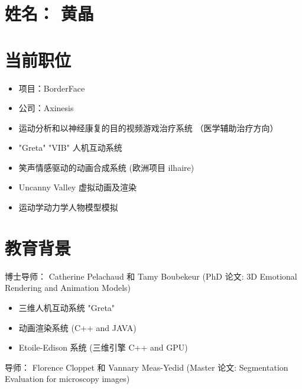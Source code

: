 \section{姓名： 黄晶}
\section{当前职位}
{
\begin{itemize}
\item 项目：BorderFace
\item 公司：Axinesis
\item 运动分析和以神经康复的目的视频游戏治疗系统 （医学辅助治疗方向）
\end{itemize}
}

{
\begin{itemize}
	\item "Greta" "VIB" 人机互动系统
	\item 笑声情感驱动的动画合成系统 (欧洲项目 ilhaire)
	\item Uncanny Valley 虚拟动画及渲染
	\item 运动学动力学人物模型模拟
\end{itemize}
}


\section{教育背景}
{博士导师： Catherine Pelachaud 和 Tamy Boubekeur (PhD 论文: 3D Emotional Rendering and Animation Models)
\begin{itemize}
	\item 三维人机互动系统 "Greta"
	\item 动画渲染系统 (C++ and JAVA)
	\item Etoile-Edison 系统 (三维引擎 C++ and GPU)
\end{itemize}
}  %

{导师： Florence Cloppet 和 Vannary Meas-Yedid (Master 论文: Segmentation Evaluation for microscopy images)
}



